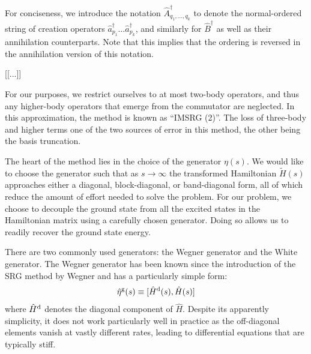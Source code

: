 \documentclass[amsmath, amssymb, aps, floatfix, nofootinbib, preprintnumbers,showpacs, superscriptaddress, twocolumn]{revtex4-1}
\begin{document}
For conciseness, we introduce the notation $\hat A_{q_1,\dots,q_k}^\dagger$ to
denote the normal-ordered string of creation operators
$\hat a_{p_1}^\dagger \dots \hat a_{p_k}^\dagger$, and similarly for
$\hat B^\dagger$ as well as their annihilation counterparts.  Note that this
implies that the ordering is reversed in the annihilation version of this
notation.

[[...]]

For our purposes, we restrict ourselves to at most two-body operators, and
thus any higher-body operators that emerge from the commutator are neglected.
In this approximation, the method is known as ``IMSRG (2)''.  The loss of
three-body and higher terms one of the two sources of error in this method,
the other being the basis truncation.

The heart of the method lies in the choice of the generator $\eta(s)$.  We
would like to choose the generator such that as $s \to \infty$ the transformed
Hamiltonian $\tilde H(s)$ approaches either a diagonal, block-diagonal, or
band-diagonal form, all of which reduce the amount of effort needed to solve
the problem.  For our problem, we choose to decouple the ground state from all
the excited states in the Hamiltonian matrix using a carefully chosen
generator.  Doing so allows us to readily recover the ground state energy.

There are two commonly used generators: the Wegner generator and the White
generator.  The Wegner generator has been known since the introduction of the
SRG method by Wegner\cite{PhysRepWegner0} and has a particularly simple form:
\begin{align*}
  \hat \eta^{\text{g}}(s) \equiv [\hat H^{\text d}(s), \hat H(s)]
\end{align*}
where $\hat H^{\text d}$ denotes the diagonal component of $\hat H$.  Despite
its apparently simplicity, it does not work particularly well in practice as
the off-diagonal elements vanish at vastly different rates, leading to
differential equations that are typically stiff.
\end{document}
